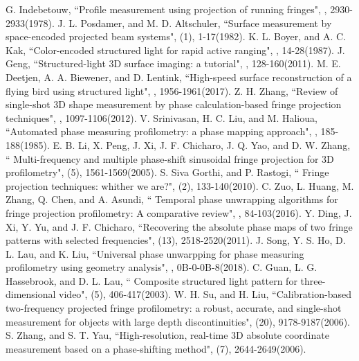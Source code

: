 \documentclass[10pt,letterpaper]{article}
\begin{document}
\begin{thebibliography}{99}
G. Indebetouw, ``Profile measurement using projection of running fringes", , 2930-2933(1978).
J. L. Posdamer, and M. D. Altschuler, ``Surface measurement by space-encoded projected beam systems", (1), 1-17(1982).
K. L. Boyer, and A. C. Kak, ``Color-encoded structured light for rapid active ranging",  , 14-28(1987).
J. Geng, ``Structured-light 3D surface imaging: a tutorial", , 128-160(2011).
M. E. Deetjen, A. A. Biewener, and D. Lentink, ``High-speed surface reconstruction of a flying bird using structured light", , 1956-1961(2017).
Z. H. Zhang, ``Review of single-shot 3D shape measurement by phase calculation-based fringe projection techniques", , 1097-1106(2012).
V. Srinivasan, H. C. Liu, and M. Halioua, ``Automated phase measuring profilometry: a phase mapping approach", , 185-188(1985).
E. B. Li, X. Peng, J. Xi, J. F. Chicharo, J. Q. Yao, and D. W. Zhang, `` Multi-frequency and multiple phase-shift sinusoidal fringe projection for 3D profilometry", (5), 1561-1569(2005).
S. Siva Gorthi, and P. Rastogi, `` Fringe projection techniques: whither we are?", (2), 133-140(2010).
C. Zuo, L. Huang, M. Zhang, Q. Chen, and A. Asundi, `` Temporal phase unwrapping algorithms for fringe projection profilometry: A comparative review", , 84-103(2016).
Y. Ding, J. Xi, Y. Yu, and J. F. Chicharo, ``Recovering the absolute phase maps of two fringe patterns with selected frequencies", (13), 2518-2520(2011).
J. Song, Y. S. Ho, D. L. Lau, and K. Liu, ``Universal phase unwarpping for phase measuring profilometry using geometry analysis", , 0B-0-0B-8(2018).
C. Guan, L. G. Hassebrook, and D. L. Lau, `` Composite structured light pattern for three-dimensional video",  (5), 406-417(2003).
W. H. Su, and H. Liu, ``Calibration-based two-frequency projected fringe profilometry: a robust, accurate, and single-shot measurement for objects with large depth discontinuities", (20), 9178-9187(2006).
S. Zhang, and S. T. Yau, ``High-resolution, real-time 3D absolute coordinate measurement based on a phase-shifting method", (7), 2644-2649(2006).

\end{thebibliography}
\end{document}
